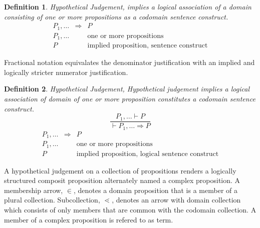\documentclass[aps,twocolumn,secnumarabic,nobalancelastpage,amsmath,amssymb,
amsthm,nofootinbib,parskip=full]{revtex4}
\numberwithin{equation}{section}
\newtheorem{definition}{Definition}[section]
\begin{document}
\begin{definition}{Hypothetical Judgement}\label{def:hypotheticaljudgement},
  implies a logical association of a domain consisting of one or more
  propositions as a codomain sentence construct.
  \begin{equation*}
  \begin{array}{rll}
   P_1,\dots&\Rightarrow& P \\[3pt]
   P_1,\dots&\quad&\text{one or more propositions} \\[3pt]
   P&\quad&\text{implied proposition, sentence construct}
  \end{array}
  \end{equation*}
\end{definition}

Fractional notation equivalates the denominator justification with
an implied and logically stricter numerator justification.

\begin{definition}{Hypothetical Judgement}\label{def:hypotheticaljudgement},
  Hypothetical judgement implies a logical association of domain of one or more proposition constitutes a codomain sentence construct.
  \begin{equation*}
     \frac{P_1,\dots\vdash P}{\vdash P_1,\dots\Rightarrow P}
  \end{equation*}
  \begin{equation*}
  \begin{array}{rll}
   P_1,\dots&\Rightarrow& P \\[3pt]
   P_1,\dots&\quad&\text{one or more propositions} \\[3pt]
   P&\quad&\text{implied proposition, logical sentence construct}
  \end{array}
  \end{equation*}
\end{definition}

A hypothetical judgement on a collection of propositions renders
a logically structured composit proposition alternately named a complex
proposition.
A membership arrow, $\in$, denotes a domain proposition that is a member
of a plural collection. Subcollection, $\lessdot$, denotes an arrow with
domain collection which consists of only members that are common with the
codomain collection. A member of a complex proposition is refered to as
term.
\end{document}
